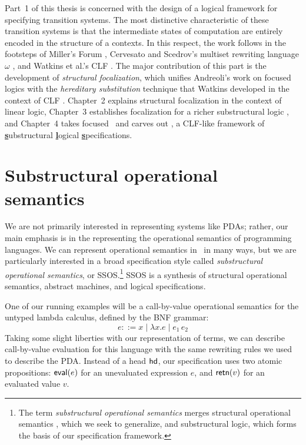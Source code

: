Part~1 of this thesis is concerned with the design of a logical
framework for specifying transition systems. The most distinctive
characteristic of these transition systems is that the intermediate
states of computation are entirely encoded in the structure of a
contexts. In this respect, the work follows in the footsteps of
Miller's Forum \cite{miller96forum}, Cervesato and Scedrov's multiset
rewriting language $\omega$ \cite{cervesato09relating}, and Watkins et
al.'s CLF \cite{watkins02concurrent}. The major contribution of this
part is the development of {\it structural focalization}, which
unifies Andreoli's work on focused logics \cite{andreoli92logic} with
the {\it hereditary substitution} technique that Watkins developed in
the context of CLF \cite{watkins02concurrent}. Chapter~2 explains
structural focalization in the context of linear logic, Chapter~3
establishes focalization for a richer substructural logic \ollll, and
Chapter~4 takes focused \ollll~and carves out \sls, a CLF-like
framework of \underline{\bf s}ubstructural \underline{\bf l}ogical
\underline{\bf s}pecifications.

\section{Substructural operational semantics}
\label{sec:intro-ssos}

We are not primarily interested in representing systems like PDAs;
rather, our main emphasis is in the representing the operational
semantics of programming languages. We can represent operational
semantics in \sls~in many ways, but we are particularly interested in a
broad specification style called {\it substructural operational
  semantics}, or SSOS.\footnote{The term {\it substructural
    operational semantics} merges structural operational semantics
  \cite{plotkin04structural}, which we seek to generalize, and
  substructural logic, which forms the basis of our specification
  framework.} SSOS is a synthesis of structural operational semantics,
abstract machines, and logical specifications.

One of our running
examples will be a call-by-value operational semantics for the untyped
lambda calculus, defined by the BNF grammar:
\[
e ::= x \mid \lambda x.e \mid e_1\,e_2
\]
Taking some slight liberties with our representation of terms, we can
describe call-by-value evaluation for this language with the same
rewriting rules we used to describe the PDA. Instead of a head ${\sf
  hd}$, our specification uses two atomic propositions: ${\sf
  eval}(e)$ for an unevaluated expression $e$, and ${\sf retn}(v)$
for an evaluated value $v$.


